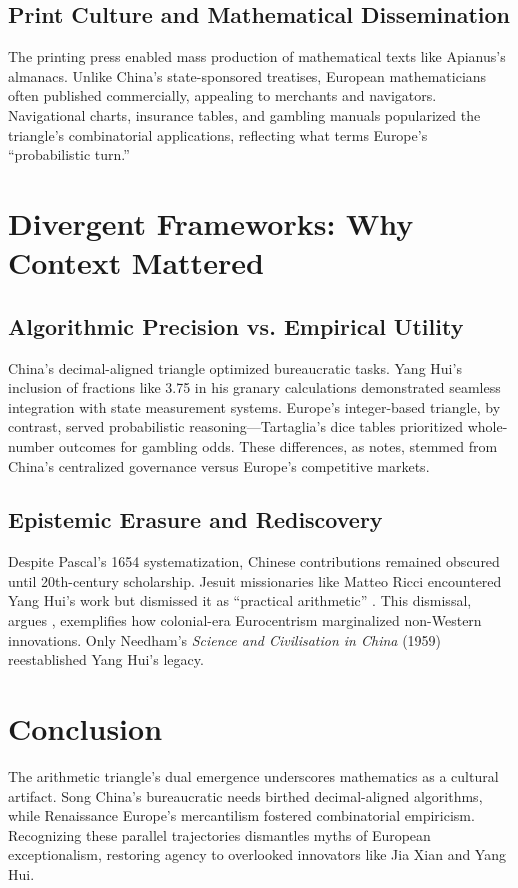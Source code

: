 \documentclass{article}
\begin{document}
\subsection{Print Culture and Mathematical Dissemination}
The printing press enabled mass production of mathematical texts like Apianus’s almanacs. Unlike China’s state-sponsored treatises, European mathematicians often published commercially, appealing to merchants and navigators. Navigational charts, insurance tables, and gambling manuals popularized the triangle’s combinatorial applications, reflecting what \cite{hacking1975} terms Europe’s “probabilistic turn.”

\section{Divergent Frameworks: Why Context Mattered}

\subsection{Algorithmic Precision vs. Empirical Utility}
China’s decimal-aligned triangle optimized bureaucratic tasks. Yang Hui’s inclusion of fractions like 3.75 in his granary calculations demonstrated seamless integration with state measurement systems. Europe’s integer-based triangle, by contrast, served probabilistic reasoning—Tartaglia’s dice tables prioritized whole-number outcomes for gambling odds. These differences, as \cite{restivo1992} notes, stemmed from China’s centralized governance versus Europe’s competitive markets.

\subsection{Epistemic Erasure and Rediscovery}
Despite Pascal’s 1654 systematization, Chinese contributions remained obscured until 20th-century scholarship. Jesuit missionaries like Matteo Ricci encountered Yang Hui’s work but dismissed it as “practical arithmetic” \cite{chen2005}. This dismissal, argues \cite{joseph2011}, exemplifies how colonial-era Eurocentrism marginalized non-Western innovations. Only Needham’s \textit{Science and Civilisation in China} (1959) reestablished Yang Hui’s legacy.

\section{Conclusion}
The arithmetic triangle’s dual emergence underscores mathematics as a cultural artifact. Song China’s bureaucratic needs birthed decimal-aligned algorithms, while Renaissance Europe’s mercantilism fostered combinatorial empiricism. Recognizing these parallel trajectories dismantles myths of European exceptionalism, restoring agency to overlooked innovators like Jia Xian and Yang Hui.
\end{document}
